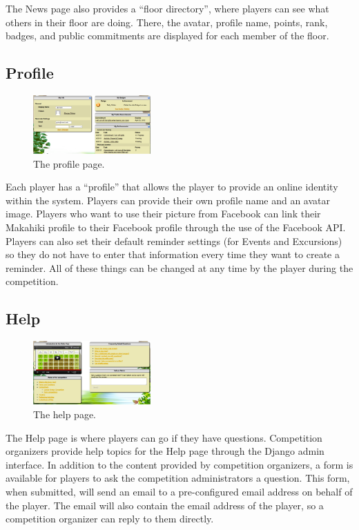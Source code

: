 The News page also provides a ``floor directory'', where players can see what others in their floor are doing. There, the avatar, profile name, points, rank, badges, and public commitments are displayed for each member of the floor.

\subsection{Profile}
\label{makahiki:pages-profile}

\begin{figure}[h]
  \center
  \includegraphics[width=0.4\textwidth]{images/profile.eps}
  \caption{The profile page.}
  \label{fig:profile-prod}
\end{figure}

Each player has a ``profile'' that allows the player to provide an online identity within the system. Players can provide their own profile name and an avatar image. Players who want to use their picture from Facebook can link their Makahiki profile to their Facebook profile through the use of the Facebook API. Players can also set their default reminder settings (for Events and Excursions) so they do not have to enter that information every time they want to create a reminder. All of these things can be changed at any time by the player during the competition.

\subsection{Help}
\label{makahiki:pages-help}

\begin{figure}[h]
  \center
  \includegraphics[width=0.4\textwidth]{images/help.eps}
  \caption{The help page.}
  \label{fig:help-prod}
\end{figure}

The Help page is where players can go if they have questions. Competition organizers provide help topics for the Help page through the Django admin interface. In addition to the content provided by competition organizers, a form is available for players to ask the competition administrators a question. This form, when submitted, will send an email to a pre-configured email address on behalf of the player. The email will also contain the email address of the player, so a competition organizer can reply to them directly.


